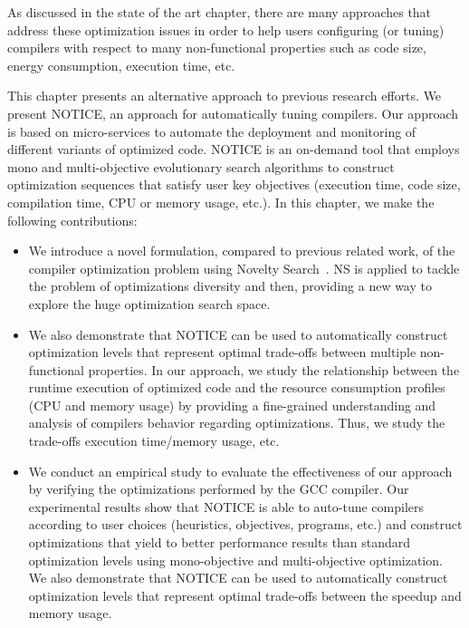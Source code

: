 As discussed in the state of the art chapter, there are many approaches that address these optimization issues in order to help users configuring (or tuning) compilers with respect to many non-functional properties such as code size, energy consumption, execution time, etc. 
	
This chapter presents an alternative approach to previous research efforts. 
We present NOTICE, an approach for automatically tuning compilers. 
Our approach is based on micro-services to automate the deployment and monitoring of different variants of optimized code. NOTICE is an on-demand tool that employs mono and multi-objective evolutionary search algorithms to construct optimization sequences that satisfy user key objectives (execution time, code size, compilation time, CPU or memory usage, etc.).
In this chapter, we make the following contributions:
 \begin{itemize} 
 	
 	\item We introduce a novel formulation, compared to previous related work, of the compiler optimization problem using Novelty Search~\cite{lehman2008exploiting}. NS is applied to tackle the problem of optimizations diversity and then, providing a new way to explore the huge optimization search space. 
 	
 	
 	\item We also demonstrate that NOTICE can be used to automatically construct optimization levels that represent optimal trade-offs between multiple non-functional properties. In our approach, we study the relationship between the runtime execution of optimized code and the resource consumption profiles (CPU and memory usage) by providing a fine-grained understanding and analysis of compilers behavior regarding optimizations. Thus, we study the trade-offs execution time/memory usage, etc.
 	
 	
 	\item We conduct an empirical study to evaluate the effectiveness of our approach by verifying the optimizations performed by the GCC compiler.
 	Our experimental results show that NOTICE is able to auto-tune compilers according to user choices (heuristics, objectives, programs, etc.) and construct optimizations that yield to better performance results than standard optimization levels using mono-objective and multi-objective optimization. We also demonstrate that NOTICE can be used to automatically construct optimization levels that represent optimal trade-offs between the speedup and memory usage.
 \end{itemize}

